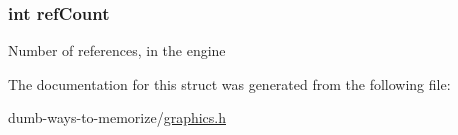 \subsubsection[{\texorpdfstring{ref\+Count}{refCount}}]{\setlength{\rightskip}{0pt plus 5cm}int ref\+Count}\hypertarget{structsprite__s_a43ab0d8eafd71383b2233bdee65911de}{}\label{structsprite__s_a43ab0d8eafd71383b2233bdee65911de}
Number of references, in the engine 

The documentation for this struct was generated from the following file\+:\begin{DoxyCompactItemize}
\item 
dumb-\/ways-\/to-\/memorize/\hyperlink{graphics_8h}{graphics.\+h}\end{DoxyCompactItemize}
